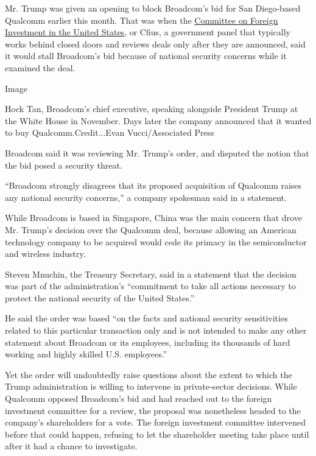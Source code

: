 Mr. Trump was given an opening to block Broadcom's bid for San
Diego-based Qualcomm earlier this month. That was when the
\href{https://www.treasury.gov/resource-center/international/Pages/Committee-on-Foreign-Investment-in-US.aspx}{Committee
on Foreign Investment in the United States}, or Cfius, a government
panel that typically works behind closed doors and reviews deals only
after they are announced, said it would stall Broadcom's bid because of
national security concerns while it examined the deal.

Image

Hock Tan, Broadcom's chief executive, speaking alongside President Trump
at the White House in November. Days later the company announced that it
wanted to buy Qualcomm.Credit...Evan Vucci/Associated Press

Broadcom said it was reviewing Mr. Trump's order, and disputed the
notion that the bid posed a security threat.

``Broadcom strongly disagrees that its proposed acquisition of Qualcomm
raises any national security concerns,'' a company spokesman said in a
statement.

While Broadcom is based in Singapore, China was the main concern that
drove Mr. Trump's decision over the Qualcomm deal, because allowing an
American technology company to be acquired would cede its primacy in the
semiconductor and wireless industry.

Steven Mnuchin, the Treasury Secretary, said in a statement that the
decision was part of the administration's ``commitment to take all
actions necessary to protect the national security of the United
States.''

He said the order was based ``on the facts and national security
sensitivities related to this particular transaction only and is not
intended to make any other statement about Broadcom or its employees,
including its thousands of hard working and highly skilled U.S.
employees.''

Yet the order will undoubtedly raise questions about the extent to which
the Trump administration is willing to intervene in private-sector
decisions. While Qualcomm opposed Broadcom's bid and had reached out to
the foreign investment committee for a review, the proposal was
nonetheless headed to the company's shareholders for a vote. The foreign
investment committee intervened before that could happen, refusing to
let the shareholder meeting take place until after it had a chance to
investigate.


